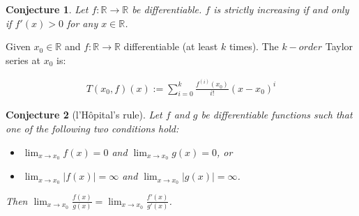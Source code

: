\documentclass[aspectratio=169]{beamer}
\newtheorem{proposition}{Conjecture}[section]
\begin{document}
\begin{frame}
    \begin{proposition}
        Let $f:\mathds{R}\rightarrow\mathds{R}$ be differentiable. $f$ is strictly increasing if and only if $f'(x)>0$ for any $ x\in\mathds{R}$.
    \end{proposition}
\end{frame}

\begin{frame}

\begin{definition}
    Given $x_0\in\mathds{R}$ and $f:\mathds{R}\rightarrow\mathds{R}$ differentiable (at least $k$ times). The $k-order$ Taylor series at $x_0$ is:
    
    \begin{align*}
        T(x_0,f)(x):=\sum_{i=0}^k \frac{f^{(i)}(x_0)}{i!}(x-x_0)^i
    \end{align*}
\end{definition}
    
\end{frame}

\begin{frame}

\begin{proposition}[l'H\^ opital's rule]

Let $f$ and $g$ be differentiable functions such that one of the following two conditions hold:

\begin{itemize}
    \item $\lim_{x\rightarrow x_0} f(x)=0$ and $\lim_{x\rightarrow x_0} g(x)=0$, or
    \item $\lim_{x\rightarrow x_0} |f(x)|=\infty$ and $\lim_{x\rightarrow x_0} |g(x)|=\infty$.
\end{itemize}
    
    Then $\lim_{x\rightarrow x_0} \frac{f(x)}{g(x)}=\lim_{x\rightarrow x_0} \frac{f'(x)}{g'(x)}$.
    
\end{proposition}
\end{frame}
\end{document}
